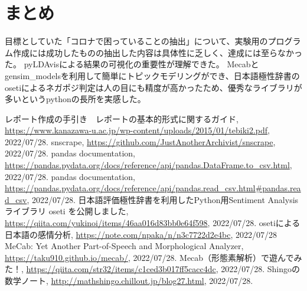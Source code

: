 \documentclass[a4paper, 11pt, titlepage]{jsarticle}
\begin{document}
\section{まとめ}
目標としていた「コロナで困っていることの抽出」について、実験用のプログラム作成には成功したものの抽出した内容は具体性に乏しく、達成には至らなかった。
pyLDAvisによる結果の可視化の重要性が理解できた。
Mecabとgensim\_modelsを利用して簡単にトピックモデリングができ、日本語極性辞書のosetiによるネガポジ判定は人の目にも精度が高かったため、優秀なライブラリが多いというpythonの長所を実感した。

\begin{thebibliography}{n}
  レポート作成の手引き　レポートの基本的形式に関するガイド, \url{https://www.kanazawa-u.ac.jp/wp-content/uploads/2015/01/tebiki2.pdf}, 2022/07/28.
      snscrape, \url{https://github.com/JustAnotherArchivist/snscrape}, 2022/07/28.
      pandas documentation, \url{https://pandas.pydata.org/docs/reference/api/pandas.DataFrame.to_csv.html}, 2022/07/28.
      pandas documentation, \url{https://pandas.pydata.org/docs/reference/api/pandas.read_csv.html#pandas.read_csv}, 2022/07/28.
      日本語評価極性辞書を利用したPython用Sentiment Analysisライブラリ oseti を公開しました, \url{https://qiita.com/yukinoi/items/46aa016d83bb0e64f598}, 2022/07/28.
      osetiによる日本語の感情分析, \url{https://note.com/npaka/n/n3c7722d2e4bc}, 2022/07/28
      MeCab: Yet Another Part-of-Speech and Morphological Analyzer, \url{https://taku910.github.io/mecab/}, 2022/07/28.
      Mecab（形態素解析）で遊んでみた！, \url{https://qiita.com/str32/items/c1ced3b017ff5cacc4dc}, 2022/07/28.
      Shingoの数学ノート, \url{http://mathshingo.chillout.jp/blog27.html}, 2022/07/28.

\end{thebibliography}
\end{document}
